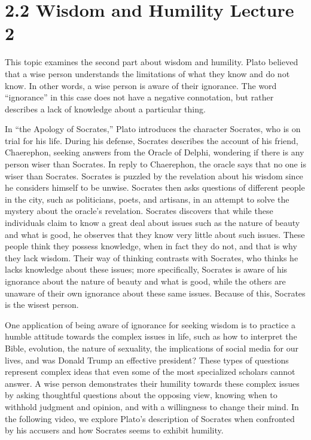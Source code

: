 \documentclass[
]{book}
\begin{document}
\hypertarget{wisdom-and-humility-lecture-2}{%
\section*{2.2 Wisdom and Humility Lecture 2}\label{wisdom-and-humility-lecture-2}}

This topic examines the second part about wisdom and humility. Plato believed that a wise person understands the limitations of what they know and do not know. In other words, a wise person is aware of their ignorance. The word ``ignorance'' in this case does not have a negative connotation, but rather describes a lack of knowledge about a particular thing.

In ``the Apology of Socrates,'' Plato introduces the character Socrates, who is on trial for his life. During his defense, Socrates describes the account of his friend, Chaerephon, seeking answers from the Oracle of Delphi, wondering if there is any person wiser than Socrates. In reply to Chaerephon, the oracle says that no one is wiser than Socrates. Socrates is puzzled by the revelation about his wisdom since he considers himself to be unwise. Socrates then asks questions of different people in the city, such as politicians, poets, and artisans, in an attempt to solve the mystery about the oracle's revelation. Socrates discovers that while these individuals claim to know a great deal about issues such as the nature of beauty and what is good, he observes that they know very little about such issues. These people think they possess knowledge, when in fact they do not, and that is why they lack wisdom. Their way of thinking contrasts with Socrates, who thinks he lacks knowledge about these issues; more specifically, Socrates is aware of his ignorance about the nature of beauty and what is good, while the others are unaware of their own ignorance about these same issues. Because of this, Socrates is the wisest person.

One application of being aware of ignorance for seeking wisdom is to practice a humble attitude towards the complex issues in life, such as how to interpret the Bible, evolution, the nature of sexuality, the implications of social media for our lives, and was Donald Trump an effective president? These types of questions represent complex ideas that even some of the most specialized scholars cannot answer. A wise person demonstrates their humility towards these complex issues by asking thoughtful questions about the opposing view, knowing when to withhold judgment and opinion, and with a willingness to change their mind. In the following video, we explore Plato's description of Socrates when confronted by his accusers and how Socrates seems to exhibit humility.
\end{document}
